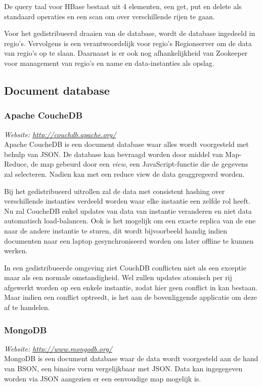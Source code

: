 De query taal voor HBase bestaat uit 4 elementen, een get, put en delete als standaard operaties en een scan om over verschillende rijen te gaan. 

Voor het gedistribueerd draaien van de database, wordt de database ingedeeld in regio's. Vervolgens is een verantwoordelijk voor regio's  Regionserver om de data van regio's op te slaan. Daarnaast is er ook nog afhankelijkheid van Zookeeper voor management van regio's en name en data-instanties als opslag.  

\subsection{Document database}
\subsubsection{Apache CoucheDB}
\textit{Website: \url{http://couchdb.apache.org/}}\\
Apache CoucheDB is een document database waar alles wordt voorgesteld met behulp van JSON. De database kan bevraagd worden door middel van Map-Reduce, de map gebeurd door een \textit{view}, een JavaScript-functie die de gegevens zal selecteren. Nadien kan met een reduce view de data geaggregeerd worden. 

Bij het gedistribueerd uitrollen zal de data met consistent hashing over verschillende instanties verdeeld worden waar elke instantie een zelfde rol heeft. Nu zal CoucheDB enkel updates van data van instantie veranderen en niet data automatisch load-balancen. Ook is het mogelijk om een exacte replica van de ene naar de andere instantie te sturen, dit wordt bijvoorbeeld handig indien documenten naar een laptop gesynchroniseerd worden om later offline te kunnen werken.

In een gedistribueerde omgeving ziet CouchDB conflicten niet als een exceptie maar als een normale omstandigheid. Wel zullen updates atomisch per rij afgewerkt worden op een enkele instantie, zodat hier geen conflict in kan bestaan. Maar indien een conflict optreedt, is het aan de bovenliggende applicatie om deze af te handelen. 


\subsubsection{MongoDB}
\textit{Website: \url{http://www.mongodb.org/}}\\
MongoDB is een document database waar de data wordt voorgesteld aan de hand van BSON, een binaire vorm vergelijkbaar met JSON. Data kan ingegegeven worden via JSON aangezien er een eenvoudige map mogelijk is. 


